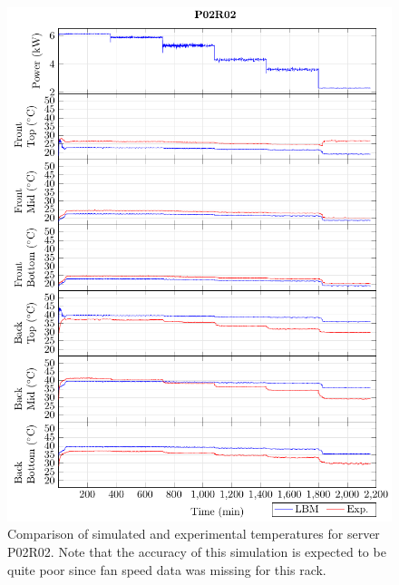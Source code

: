 \begin{figure}[!htb]
\centering
\includegraphics[width=\linewidth]{Plots/P02R02_T.pdf}
\caption{Comparison of simulated and experimental temperatures for server P02R02. Note that the accuracy of this simulation is expected to be quite poor since fan speed data was missing for this rack.}
\label{fig:P02R02_plot}
\end{figure}

\clearpage

